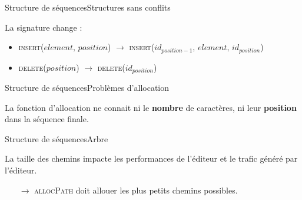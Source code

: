 \begin{frame}{Structure de séquences}{Structures sans conflits}
  
  La signature change : 
  \begin{itemize}
  \item \textsc{insert}($element,\, position$) $\rightarrow$
    \textsc{insert}($id_{position-1},\, element,\, id_{position}$)
  \item \textsc{delete}($position$) $\rightarrow$ \textsc{delete}($id_{position}$)
  \end{itemize}

  \vspace{0.5cm}
  

  \begin{algorithm}[H]
    
  \end{algorithm}

\end{frame}


\begin{frame}{Structure de séquences}{Problèmes d'allocation}

  La fonction d'allocation ne connait ni le \textbf{nombre} de caractères, ni
  leur \textbf{position} dans la séquence finale.

  \vspace{0.5cm}

  \begin{center}
    
  \end{center}

\end{frame}


\begin{frame}{Structure de séquences}{Arbre}
  
  \begin{center}
    
  \end{center}
  
  \vspace{0.5cm}
  
  La taille des chemins impacte les performances de l'éditeur et le trafic
  généré par l'éditeur.
  \begin{itemize}
  \item [$\rightarrow$] \textsc{allocPath} doit allouer les plus petits chemins
    possibles.
  \end{itemize}

\end{frame}


